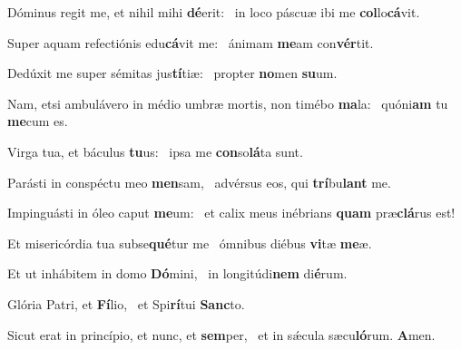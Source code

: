 \item Dóminus regit me, et nihil mihi \textbf{dé}erit:~\psstar{} in loco páscuæ ibi me \textbf{col}lo\textbf{cá}vit.
\item Super aquam refectiónis edu\textbf{cá}vit me:~\psstar{} ánimam \textbf{me}am con\textbf{vér}tit.
\item Dedúxit me super sémitas jus\textbf{tí}tiæ:~\psstar{} propter \textbf{no}men \textbf{su}um.
\item Nam, etsi ambulávero in médio umbræ mortis, non timébo \textbf{ma}la:~\psstar{} quóni\textbf{am} tu \textbf{me}cum es.
\item Virga tua, et báculus \textbf{tu}us:~\psstar{} ipsa me \textbf{con}so\textbf{lá}ta sunt.
\item Parásti in conspéctu meo \textbf{men}sam,~\psstar{} advérsus eos, qui \textbf{trí}bu\textbf{lant} me.
\item Impinguásti in óleo caput \textbf{me}um:~\psstar{} et calix meus inébrians \textbf{quam} præ\textbf{clá}rus est!
\item Et misericórdia tua subse\textbf{qué}\-tur me~\psstar{} ómnibus diébus \textbf{vi}tæ \textbf{me}æ.
\item Et ut inhábitem in domo \textbf{Dó}mini,~\psstar{} in longitúdi\textbf{nem} di\textbf{é}rum.
\item Glória Patri, et \textbf{Fí}lio,~\psstar{} et Spi\textbf{rí}tui \textbf{Sanc}to.
\item Sicut erat in princípio, et nunc, et \textbf{sem}per,~\psstar{} et in sǽcula sæcu\textbf{ló}rum. \textbf{A}men.
